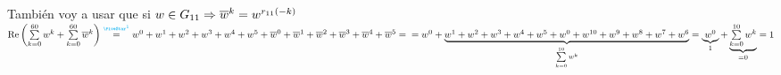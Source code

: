 \documentclass[12pt,a4paper, spanish]{article}
\begin{document}
\begin{enumerate}[label=\roman*)]
	      También voy a usar que si $w \in G_{11} \Rightarrow \overline w^k = w^{r_{11}(-k)}$\\
	      $\re\parentesis{\sumatoria{k=0}{60}w^k +\sumatoria{k=0}{60}\conj w^k } \stackrel{\llamada1}=
		      w^0 + w^1 + w^2 + w^3 + w^4 + w^5 + \conj w^0 + \conj w^1 + \conj w^2 + \conj w^3 + \conj w^4 + \conj w^5 =\\
		      = w^0 + \ub{w^1 + w^2 + w^3 + w^4 + w^5 + w^0 + w^{10} + w^9 + w^8 + w^7 + w^6}{\sumatoria{k=0}{10} w^k} =
		      \ub{w^0}{1} + \ub{\sumatoria{k=0}{10} w^k}{= 0} = 1
	      $

\end{enumerate}
\end{document}
